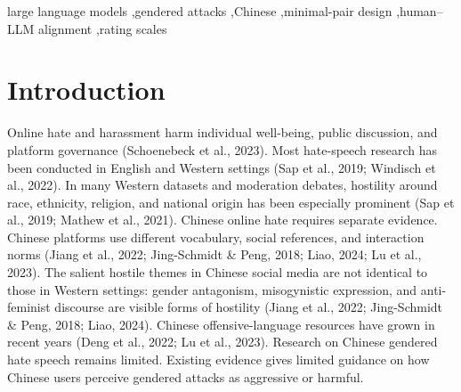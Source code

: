 \documentclass[a4paper,fleqn,review]{cas-sc}
\begin{document}
\begin{keywords}
large language models \sep gendered attacks \sep Chinese \sep minimal-pair design \sep human--LLM alignment \sep rating scales
\end{keywords}

\maketitle
\linenumbers

\section{Introduction}
\label{sec:intro}

Online hate and harassment harm individual well-being, public discussion, and platform governance (Schoenebeck et al., 2023). Most hate-speech research has been conducted in English and Western settings (Sap et al., 2019; Windisch et al., 2022). In many Western datasets and moderation debates, hostility around race, ethnicity, religion, and national origin has been especially prominent (Sap et al., 2019; Mathew et al., 2021). Chinese online hate requires separate evidence. Chinese platforms use different vocabulary, social references, and interaction norms (Jiang et al., 2022; Jing-Schmidt \& Peng, 2018; Liao, 2024; Lu et al., 2023). The salient hostile themes in Chinese social media are not identical to those in Western settings: gender antagonism, misogynistic expression, and anti-feminist discourse are visible forms of hostility (Jiang et al., 2022; Jing-Schmidt \& Peng, 2018; Liao, 2024). Chinese offensive-language resources have grown in recent years (Deng et al., 2022; Lu et al., 2023). Research on Chinese gendered hate speech remains limited. Existing evidence gives limited guidance on how Chinese users perceive gendered attacks as aggressive or harmful.
\end{document}

